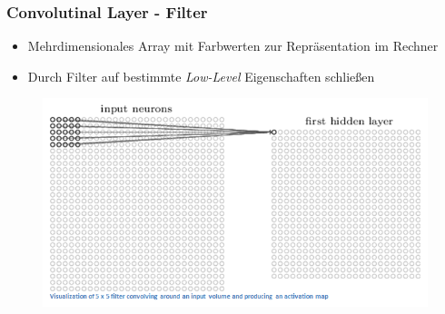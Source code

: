 \begin{frame}
\frametitle{Convolutinal Layer - Filter}

\begin{itemize}
\item Mehrdimensionales Array mit Farbwerten zur Repräsentation im Rechner
\item Durch Filter auf bestimmte \emph{Low-Level} Eigenschaften schließen
\end{itemize}

\begin{figure}
	\includegraphics[width=.8\linewidth]{./aktuelleEntwicklung/convolutionalNN/img/cnn_convLayer_alpha}
\end{figure}





\end{frame}


